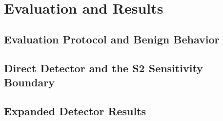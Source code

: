 \documentclass{vgtc}                          %
\begin{document}

\section{Evaluation and Results}

\subsection{Evaluation Protocol and Benign Behavior}

\subsection{Direct Detector and the S2 Sensitivity Boundary}


\subsection{Expanded Detector Results}


\end{document}
